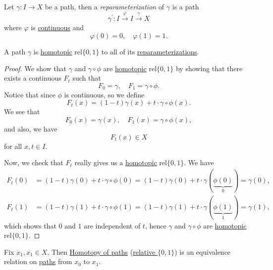 \begin{definition}[Reparameterization]\label{def:reparameterization}
	Let \(\gamma\colon I\to X\) be a path, then a \emph{reparameterization} of \(\gamma\) is a path
	\[
		\gamma ^\prime \colon I\overset{\varphi }{\longrightarrow} I\overset{\gamma}{\longrightarrow} X
	\]
	where \(\varphi \) is \underline{continuous} and
	\[
		\varphi (0) = 0,\quad \varphi (1) = 1.
	\]
\end{definition}

\begin{exercise}
	A path \(\gamma\) is \hyperref[def:homotopic]{homotopic} \(\mathrm{rel} \{0, 1\}\) to all of its \hyperref[def:reparameterization]{reparameterizations}.
\end{exercise}
\begin{proof}
	\par We show that \(\gamma\) and \(\gamma\circ \phi \) are \hyperref[def:homotopic]{homotopic} \(\mathrm{rel} \{0, 1\}\) by showing that
	there exists a continuous \(F_t\) such that
	\[
		F_0 = \gamma,\quad F_1 = \gamma\circ \phi.
	\]
	Notice that since \(\phi \) is continuous, so we define
	\[
		F_t(x) = (1 - t) \gamma(x) + t\cdot \gamma\circ \phi (x).
	\]
	We see that
	\[
		F_0(x) = \gamma(x),\quad F_1(x) = \gamma\circ \phi (x),
	\]
	and also, we have
	\[
		F_t(x)\in X
	\]
	for all \(x, t\in I\).

	\par Now, we check that \(F_t\) really gives us a \hyperref[def:homotopic]{homotopic} \(\mathrm{rel}\{0, 1\}\). We have
	\[
		\begin{split}
			F_t(0) &= (1 - t)\gamma(0) + t\cdot \gamma\circ \phi (0) = (1 - t)\gamma(0) + t\cdot \gamma(\underbrace{\phi (0)}_{0}) = \gamma(0),\\
			F_t(1) &= (1 - t)\gamma(1) + t\cdot \gamma\circ \phi (1) = (1 - t)\gamma(1) + t\cdot \gamma(\underbrace{\phi (1)}_{1}) = \gamma(1),
		\end{split}
	\]
	which shows that \(0\) and \(1\) are independent of \(t\), hence \(\gamma\) and \(\gamma\circ \phi \) are \hyperref[def:homotopy-relative]{homotopic \(\mathrm{rel} \{0, 1\}\)}.
\end{proof}

\begin{exercise}
	Fix \(x_1, x_1\in X\). Then \hyperref[def:homotopy-path]{\underline{Homotopy of paths}} (\hyperref[def:homotopy-relative]{relative \(\{0, 1\}\)}) is an
	equivalence relation on \hyperref[def:path]{paths} from \(x_0\) to \(x_1\).
\end{exercise}

